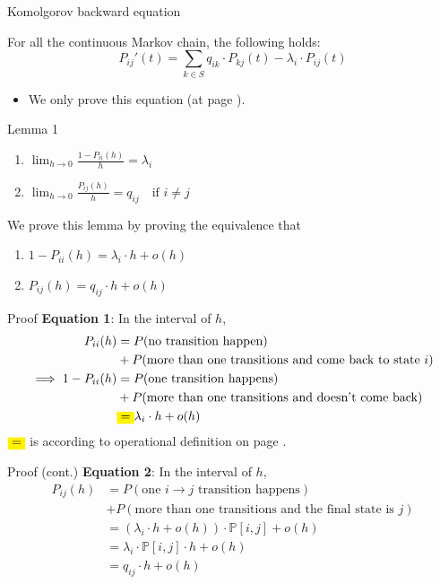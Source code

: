 \documentclass[mathserif]{beamer}
\begin{document}
\begin{frame}{Komolgorov backward equation}
\begin{theorem}
For all the continuous Markov chain, the following holds:
\[
{P_{ij}}'(t) = \sum_{k\in S} q_{ik}\cdot P_{kj}(t) - \lambda_i\cdot P_{ij}(t)
\]
\end{theorem}
\begin{itemize}
\item We only prove this equation (at page \pageref{backward_pf}).
\end{itemize}
\end{frame}

\begin{frame}{Lemma 1}
\begin{lemma}
\begin{enumerate}
\item $\displaystyle{\lim_{h\to 0}\frac{1-P_{ii}(h)}{h} = \lambda_i}$
\item $\displaystyle{\lim_{h\to 0}\frac{P_{ij}(h)}{h} = q_{ij} \quad\text{if } i\neq j}$
\end{enumerate}
\end{lemma}
We prove this lemma by proving the equivalence that
\begin{enumerate}
\item $1 - P_{ii}(h) = \lambda_i\cdot h + o(h)$
\item $P_{ij}(h) = q_{ij}\cdot h + o(h)$
\end{enumerate}
\end{frame}

\begin{frame}{Proof}
\textbf{Equation 1}: In the interval of $h$,
\begin{align*}
P_{ii}(h) & = P(\text{no transition happen}) \\
\qquad & + P(\text{more than one transitions and come back to state $i$}) \\
\implies 1 - P_{ii}(h) & = P(\text{one transition happens}) \\
\qquad & + P(\text{more than one transitions and doesn't come back}) \\
& \colorbox{yellow}{=} \lambda_i\cdot h + o(h)
\end{align*}
$\colorbox{yellow}{=}$ is according to operational definition on page \pageref{operation_def}.
\end{frame}

\begin{frame}{Proof (cont.)}
\textbf{Equation 2}: In the interval of $h$,
\begin{align*}
P_{ij}(h) & = P(\text{one $i\to j$ transition happens}) \\
\qquad & + P(\text{more than one transitions and the final state is $j$}) \\
& = (\lambda_i\cdot h + o(h))\cdot \mathbb{P}[i,j] + o(h) \\
& = \lambda_i\cdot \mathbb{P}[i,j]\cdot h + o(h) \\
& = q_{ij}\cdot h + o(h)
\end{align*}
\end{frame}
\end{document}
